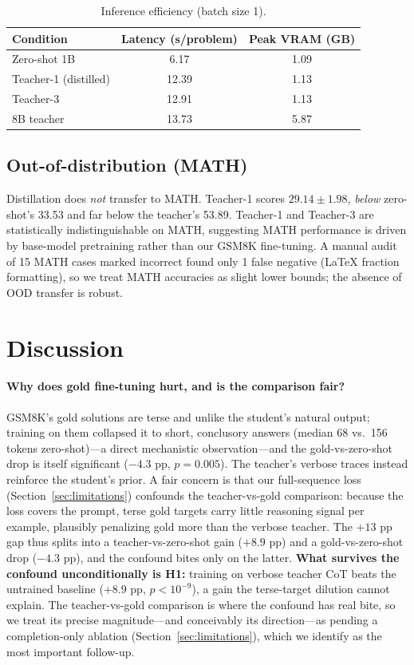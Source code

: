 \documentclass[11pt]{article}
\begin{document}
\begin{table}[H]
\centering
\caption{Inference efficiency (batch size 1).}
\label{tab:efficiency}
\begin{tabular}{lcc}
\toprule
Condition & Latency (s/problem) & Peak VRAM (GB) \\
\midrule
Zero-shot 1B        & 6.17  & 1.09 \\
Teacher-1 (distilled) & 12.39 & 1.13 \\
Teacher-3           & 12.91 & 1.13 \\
8B teacher          & 13.73 & 5.87 \\
\bottomrule
\end{tabular}
\end{table}

\subsection{Out-of-distribution (MATH)}
\label{sec:ood}
Distillation does \emph{not} transfer to MATH. Teacher-1 scores $29.14\pm1.98$,
\emph{below} zero-shot's 33.53 and far below the teacher's 53.89. Teacher-1 and
Teacher-3 are statistically indistinguishable on MATH, suggesting MATH performance
is driven by base-model pretraining rather than our GSM8K fine-tuning. A manual
audit of 15 MATH cases marked incorrect found only 1 false negative (LaTeX fraction
formatting), so we treat MATH accuracies as slight lower bounds; the absence of OOD
transfer is robust.

\section{Discussion}
\paragraph{Why does gold fine-tuning hurt, and is the comparison fair?} GSM8K's
gold solutions are terse and unlike the student's natural output; training on them
collapsed it to short, conclusory answers (median 68 vs.\ 156 tokens
zero-shot)---a direct mechanistic observation---and the gold-vs-zero-shot drop is
itself significant ($-4.3$ pp, $p=0.005$). The teacher's verbose traces instead
reinforce the student's prior. A fair concern is that our full-sequence loss
(Section~\ref{sec:limitations}) confounds the teacher-vs-gold comparison: because
the loss covers the prompt, terse gold targets carry little reasoning signal per
example, plausibly penalizing gold more than the verbose teacher. The $+13$ pp gap
thus splits into a teacher-vs-zero-shot gain ($+8.9$ pp) and a gold-vs-zero-shot
drop ($-4.3$ pp), and the confound bites only on the latter. \textbf{What survives
the confound unconditionally is H1:} training on verbose teacher CoT beats the
untrained baseline ($+8.9$ pp, $p<10^{-9}$), a gain the terse-target dilution
cannot explain. The teacher-vs-gold comparison is where the confound has real bite,
so we treat its precise magnitude---and conceivably its direction---as pending a
completion-only ablation (Section~\ref{sec:limitations}), which we identify as the
most important follow-up.
\end{document}
